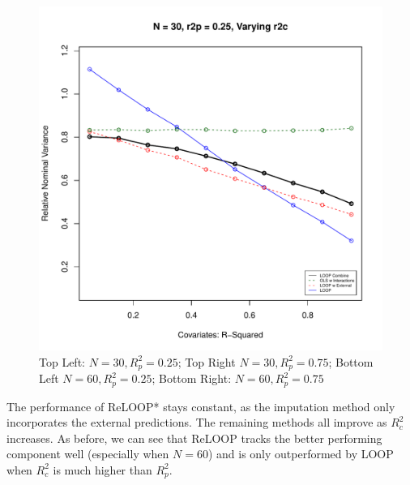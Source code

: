 \begin{figure}[H]
	\includegraphics[width=.49\linewidth,page = 4]{images/r2c.pdf} \quad
	\caption{Top Left: $N = 30, R^2_p = 0.25$; Top Right $N = 30, R^2_p = 0.75$; Bottom Left $N = 60, R^2_p = 0.25$; Bottom Right: $N = 60, R^2_p = 0.75$}
\end{figure}
The performance of ReLOOP* stays constant, as the imputation method only incorporates the external predictions. The remaining methods all improve as $R^2_c$ increases. As before, we can see that ReLOOP tracks the better performing component well (especially when $N = 60$) and is only outperformed by LOOP when $R^2_c$ is much higher than $R^2_p$.

